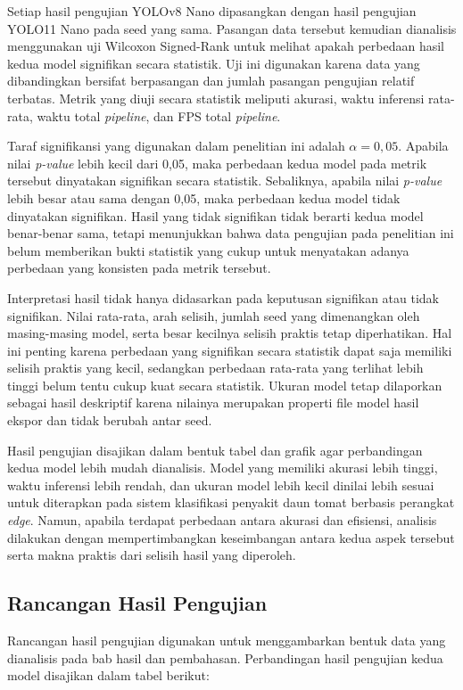 \begin{sectioncontent}
\begin{subsectioncontent}
    Setiap hasil pengujian YOLOv8 Nano dipasangkan dengan hasil pengujian YOLO11 Nano pada seed yang sama. Pasangan data tersebut kemudian dianalisis menggunakan uji Wilcoxon Signed-Rank untuk melihat apakah perbedaan hasil kedua model signifikan secara statistik. Uji ini digunakan karena data yang dibandingkan bersifat berpasangan dan jumlah pasangan pengujian relatif terbatas. Metrik yang diuji secara statistik meliputi akurasi, waktu inferensi rata-rata, waktu total \textit{pipeline}, dan FPS total \textit{pipeline}.

    Taraf signifikansi yang digunakan dalam penelitian ini adalah $\alpha = 0{,}05$. Apabila nilai \textit{p-value} lebih kecil dari 0,05, maka perbedaan kedua model pada metrik tersebut dinyatakan signifikan secara statistik. Sebaliknya, apabila nilai \textit{p-value} lebih besar atau sama dengan 0,05, maka perbedaan kedua model tidak dinyatakan signifikan. Hasil yang tidak signifikan tidak berarti kedua model benar-benar sama, tetapi menunjukkan bahwa data pengujian pada penelitian ini belum memberikan bukti statistik yang cukup untuk menyatakan adanya perbedaan yang konsisten pada metrik tersebut.

    Interpretasi hasil tidak hanya didasarkan pada keputusan signifikan atau tidak signifikan. Nilai rata-rata, arah selisih, jumlah seed yang dimenangkan oleh masing-masing model, serta besar kecilnya selisih praktis tetap diperhatikan. Hal ini penting karena perbedaan yang signifikan secara statistik dapat saja memiliki selisih praktis yang kecil, sedangkan perbedaan rata-rata yang terlihat lebih tinggi belum tentu cukup kuat secara statistik. Ukuran model tetap dilaporkan sebagai hasil deskriptif karena nilainya merupakan properti file model hasil ekspor dan tidak berubah antar seed.

    Hasil pengujian disajikan dalam bentuk tabel dan grafik agar perbandingan kedua model lebih mudah dianalisis. Model yang memiliki akurasi lebih tinggi, waktu inferensi lebih rendah, dan ukuran model lebih kecil dinilai lebih sesuai untuk diterapkan pada sistem klasifikasi penyakit daun tomat berbasis perangkat \textit{edge}. Namun, apabila terdapat perbedaan antara akurasi dan efisiensi, analisis dilakukan dengan mempertimbangkan keseimbangan antara kedua aspek tersebut serta makna praktis dari selisih hasil yang diperoleh.
\end{subsectioncontent}

\subsection{Rancangan Hasil Pengujian}
\begin{subsectioncontent}
    \hspace{\parindent}Rancangan hasil pengujian digunakan untuk menggambarkan bentuk data yang dianalisis pada bab hasil dan pembahasan. Perbandingan hasil pengujian kedua model disajikan dalam tabel berikut:


\end{subsectioncontent}
\end{sectioncontent}
